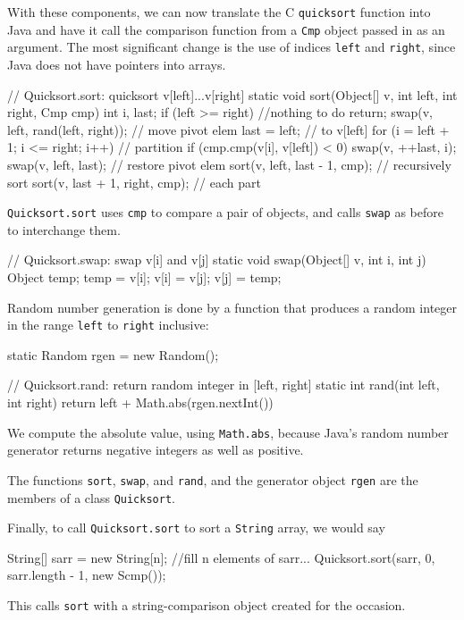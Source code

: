 With these components, we can now translate the C \verb'quicksort' function
into Java and have it call the comparison function from a \verb'Cmp' object
passed in as an argument. The most significant change is the use of indices
\verb'left' and \verb'right', since Java does not have pointers into
arrays.
\begin{wellcode}
    // Quicksort.sort: quicksort v[left]...v[right]
    static void sort(Object[] v, int left, int right, Cmp cmp)
    {
        int i, last;
        if (left >= right)  //nothing to do
            return;
        swap(v, left, rand(left, right));    // move pivot elem
        last = left;                        //      to v[left]
        for (i = left + 1; i <= right; i++) // partition
            if (cmp.cmp(v[i], v[left]) < 0)
                swap(v, ++last, i);
        swap(v, left, last);                // restore pivot elem
        sort(v, left, last - 1, cmp);       // recursively sort
        sort(v, last + 1, right, cmp);      //      each part
    }
\end{wellcode}
\verb'Quicksort.sort' uses \verb'cmp' to compare a pair of objects, and
calls \verb'swap' as before to interchange them.
\begin{wellcode}
    // Quicksort.swap: swap v[i] and v[j]
    static void swap(Object[] v, int i, int j)
    {
        Object temp;
        temp = v[i];
        v[i] = v[j];
        v[j] = temp;
    }
\end{wellcode}
Random number generation is done by a function that produces a random
integer in the range \verb'left' to \verb'right' inclusive:
\begin{wellcode}
    static Random rgen = new Random();

    // Quicksort.rand: return random integer in [left, right]
    static int rand(int left, int right)
    {
        return left + Math.abs(rgen.nextInt()) %
    }
\end{wellcode}
We compute the absolute value, using \verb'Math.abs', because Java's random
number generator returns negative integers as well as positive.

The functions \verb'sort', \verb'swap', and \verb'rand', and the generator
object \verb'rgen' are the members of a class \verb'Quicksort'.

Finally, to call \verb'Quicksort.sort' to sort a \verb'String' array, we
would say
\begin{wellcode}
    String[] sarr = new String[n];
    //fill n elements of sarr...
    Quicksort.sort(sarr, 0, sarr.length - 1, new Scmp());
\end{wellcode}
This calls \verb'sort' with a string-comparison object created for the
occasion.

